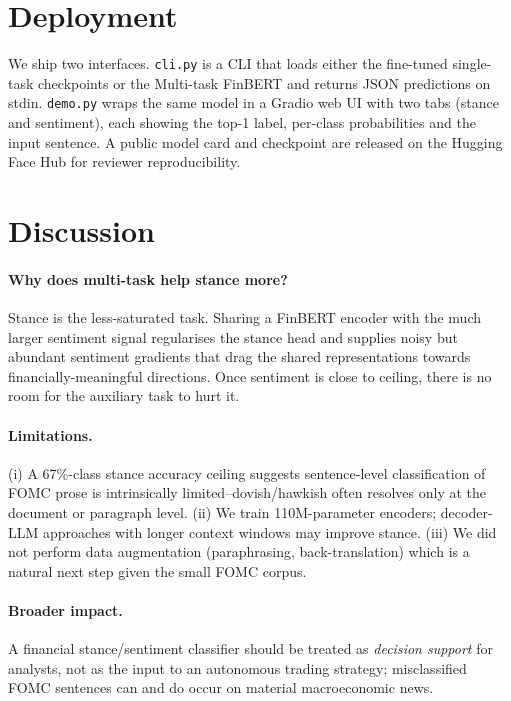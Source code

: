 \documentclass[conference, 10pt, twocolumn]{IEEEtran}
\begin{document}
\section{Deployment}
\label{sec:deploy}
We ship two interfaces. \texttt{cli.py} is a CLI that loads either the
fine-tuned single-task checkpoints or the Multi-task FinBERT and returns
JSON predictions on stdin. \texttt{demo.py} wraps the same model in a
Gradio web UI with two tabs (stance and sentiment), each showing the
top-1 label, per-class probabilities and the input sentence. A public
model card and checkpoint are released on the Hugging Face Hub for
reviewer reproducibility.

\section{Discussion}
\label{sec:discussion}

\paragraph{Why does multi-task help stance more?} Stance is the
less-saturated task. Sharing a FinBERT encoder with the much larger
sentiment signal regularises the stance head and supplies noisy but
abundant sentiment gradients that drag the shared representations
towards financially-meaningful directions. Once sentiment is close to
ceiling, there is no room for the auxiliary task to hurt it.

\paragraph{Limitations.} (i) A 67\%-class stance accuracy ceiling
suggests sentence-level classification of FOMC prose is intrinsically
limited--dovish/hawkish often resolves only at the document or paragraph
level. (ii) We train 110M-parameter encoders; decoder-LLM approaches
with longer context windows may improve stance. (iii) We did not perform
data augmentation (paraphrasing, back-translation) which is a natural
next step given the small FOMC corpus.

\paragraph{Broader impact.} A financial stance/sentiment classifier
should be treated as \emph{decision support} for analysts, not as the
input to an autonomous trading strategy; misclassified FOMC sentences
can and do occur on material macroeconomic news.
\end{document}
